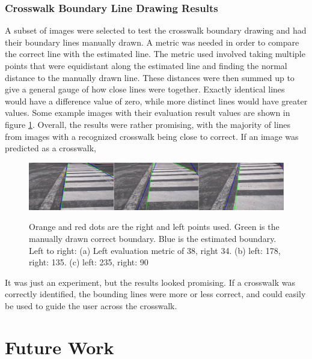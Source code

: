 \documentclass[12pt]{ucthesis}
\newcommand{\captionfonts}{\small\bf\ssp}
\begin{document}
\subsection{Crosswalk Boundary Line Drawing Results}


A subset of images were selected to test the crosswalk boundary drawing and had their boundary lines manually drawn. A metric was needed in order to compare the correct line with the estimated line. The metric used involved taking multiple points that were equidistant along the estimated line and finding the normal distance to the manually drawn line. These distances were then summed up to give a general gauge of how close lines were together. Exactly identical lines would have a difference value of zero, while more distinct lines would have greater values. Some example images with their evaluation result values are shown in figure \ref{fig:LinesUsingJustGoodStartAndEnds2}. Overall, the results were rather promising, with the majority of lines from images with a recognized crosswalk being close to correct. If an image was predicted as a crosswalk, 

\begin{figure}[h!]
\begin{center}
\includegraphics[width=15cm]{LinesUsingJustGoodStartAndEnds2.png}
\captionfonts
\caption[Boundary Line Estimation Results]{Orange and red dots are the right and left points used. Green is the manually drawn correct boundary. Blue is the estimated boundary. Left to right: (a) Left evaluation metric of 38, right 34. (b) left: 178, right: 135. (c) left: 235, right: 90}
\label{fig:LinesUsingJustGoodStartAndEnds2}
\end{center}
\end{figure}

It was just an experiment, but the results looked promising. If a crosswalk was correctly identified, the bounding lines were more or less correct, and could easily be used to guide the user across the crosswalk. 


\chapter{Future Work}
\label{future work}
\end{document}
